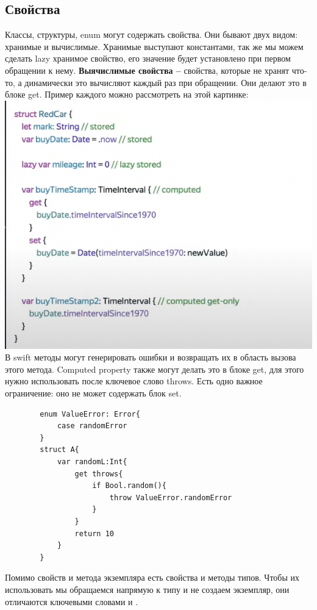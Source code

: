 \documentclass{article}
\begin{document}
    \subsection{Свойства}
    Классы, структуры, enum могут содержать свойства. Они бывают двух видом: хранимые и вычислимые. Хранимые выступают константами, так же мы можем сделать lazy хранимое свойство, его значение будет установлено при первом обращении к нему. 
    \textbf{Выячислимые свойства --} свойства, которые не хранят что-то, а динамически это вычисляют каждый раз при обращении. Они делают это в блоке get. Пример каждого можно рассмотреть на этой картинке: 
    \newline
    \includegraphics[scale = 0.5]{pic/propsAdvSwift.png}
    \newline
    В swift методы могут генерировать ошибки и возвращать их в область вызова этого метода. Computed property также могут делать это в блоке get, для этого нужно использовать после ключевое слово throws. Есть одно важное ограничение: оно не может содержать блок set.
    \begin{verbatim}
        enum ValueError: Error{
            case randomError            
        }
        struct A{
            var randomL:Int{
                get throws{
                    if Bool.random(){
                        throw ValueError.randomError
                    }
                }
                return 10
            }
        }
    \end{verbatim}
    Помимо свойств и метода экземпляра есть свойства и методы типов. Чтобы их использовать мы обращаемся напрямую к типу и не создаем экземпляр, они отличаются ключевыми словами  и .
\end{document}
